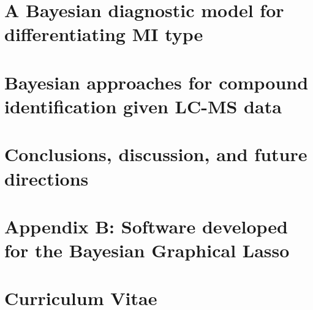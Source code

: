 \documentclass[final]{ulthesis}
\begin{document}
\chapter{A Bayesian diagnostic model for differentiating MI type}


\chapter{Bayesian approaches for compound identification given LC-MS data}


\chapter{Conclusions, discussion, and future directions} 



\backmatter
\begin{DoubleSpace*}


%
%


\end{DoubleSpace*}

%

\chapter{Appendix B: Software developed for the Bayesian Graphical Lasso}


\chapter{Curriculum Vitae}
\begin{DoubleSpace*}

\end{DoubleSpace*}
\end{document}
